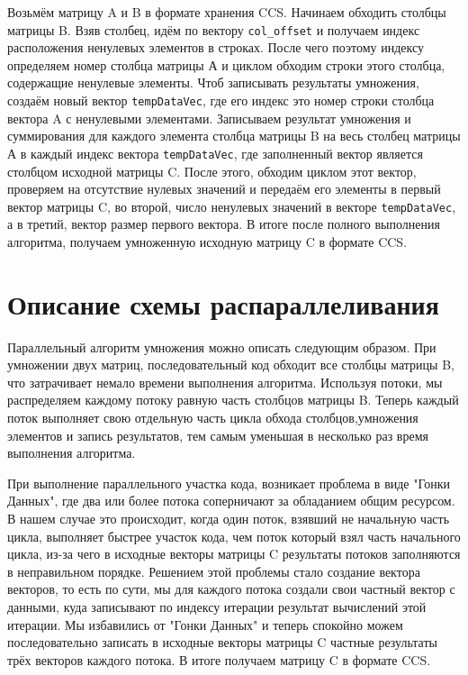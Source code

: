 \documentclass[14pt,a4paper,report]{ncc}
\begin{document}
	
	Возьмём матрицу A и B в формате хранения CCS. Начинаем обходить столбцы матрицы B. Взяв столбец, идём по вектору \verb|col_offset| и получаем индекс расположения ненулевых элементов в строках. После чего поэтому индексу определяем номер столбца матрицы А и циклом обходим строки этого столбца, содержащие ненулевые элементы. Чтоб записывать результаты умножения, создаём новый вектор \verb|tempDataVec|, где его индекс это номер строки столбца вектора A с ненулевыми элементами. Записываем результат умножения и суммирования для каждого элемента столбца матрицы B на весь столбец матрицы А в каждый индекс вектора \verb|tempDataVec|, где заполненный вектор является столбцом исходной матрицы C. После этого, обходим циклом этот вектор, проверяем на отсутствие нулевых значений и передаём его элементы в первый вектор матрицы C, во второй, число ненулевых значений в векторе \verb|tempDataVec|, а в третий, вектор размер первого вектора. В итоге после полного выполнения алгоритма, получаем умноженную исходную матрицу C в формате CCS.
	\newpage
	
	\section*{Описание схемы распараллеливания}
	Параллельный алгоритм умножения можно описать следующим образом. При умножении двух матриц, последовательный код обходит все столбцы матрицы B, что затрачивает немало времени выполнения алгоритма. Используя потоки, мы распределяем каждому потоку равную часть столбцов матрицы B. Теперь каждый поток выполняет свою отдельную часть цикла обхода столбцов,умножения элементов и запись результатов, тем самым уменьшая в несколько раз время выполнения алгоритма. 
	\par При выполнение параллельного участка кода, возникает проблема в виде "Гонки Данных"{}, где два или более потока соперничают за обладанием общим ресурсом. В нашем случае это происходит, когда один поток, взявший не начальную часть цикла, выполняет быстрее участок кода, чем поток который взял часть начального цикла, из-за чего в исходные векторы матрицы C результаты потоков заполняются в неправильном порядке. Решением этой проблемы стало создание вектора векторов, то есть по сути, мы для каждого потока создали свои частный вектор с данными, куда записывают по индексу итерации результат вычислений этой итерации. Мы избавились от "Гонки Данных" и теперь спокойно можем последовательно записать в исходные векторы матрицы C частные результаты трёх векторов каждого потока. В итоге получаем матрицу C в формате CCS.
	\newpage
	
\end{document}
